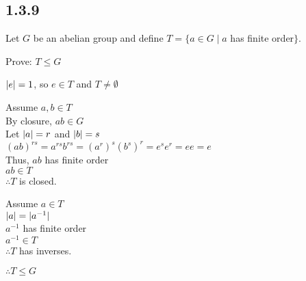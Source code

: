 \documentclass[letterpaper,12pt,fleqn]{article}
\begin{document}
\subsection*{1.3.9}

Let $G$ be an abelian group and define $T=\{a\in G\mid a$ has finite order$\}$.

Prove: $T\le G$

$\lvert e\rvert=1$, so $e\in T$ and $T\ne\emptyset$

Assume $a,b\in T$ \\
By closure, $ab\in G$ \\
Let $\lvert a\rvert=r$ and $\lvert b\rvert=s$ \\
$(ab)^{rs}=a^{rs}b^{rs}=(a^r)^s(b^s)^r=e^se^r=ee=e$ \\
Thus, $ab$ has finite order \\
$ab\in T$ \\
$\therefore T$ is closed.

Assume $a\in T$ \\
$\lvert a\rvert=\lvert a^{-1}\rvert$ \\
$a^{-1}$ has finite order \\
$a^{-1}\in T$ \\
$\therefore T$ has inverses.

$\therefore T\le G$
\end{document}
